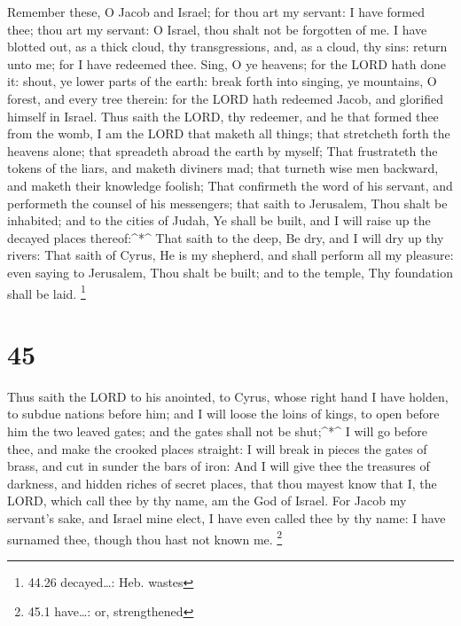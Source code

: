  Remember these, O Jacob and Israel; for thou art my
servant: I have formed thee; thou art my servant: O Israel, thou shalt
not be forgotten of me.  I have blotted out, as a thick
cloud, thy transgressions, and, as a cloud, thy sins: return unto me;
for I have redeemed thee.  Sing, O ye heavens; for the LORD
hath done it: shout, ye lower parts of the earth: break forth into
singing, ye mountains, O forest, and every tree therein: for the LORD
hath redeemed Jacob, and glorified himself in Israel.  Thus
saith the LORD, thy redeemer, and he that formed thee from the womb, I
am the LORD that maketh all things; that stretcheth forth the heavens
alone; that spreadeth abroad the earth by myself;  That
frustrateth the tokens of the liars, and maketh diviners mad; that
turneth wise men backward, and maketh their knowledge foolish;
 That confirmeth the word of his servant, and performeth
the counsel of his messengers; that saith to Jerusalem, Thou shalt be
inhabited; and to the cities of Judah, Ye shall be built, and I will
raise up the decayed places thereof:\^{}*\^{}  That saith
to the deep, Be dry, and I will dry up thy rivers:  That
saith of Cyrus, He is my shepherd, and shall perform all my pleasure:
even saying to Jerusalem, Thou shalt be built; and to the temple, Thy
foundation shall be laid. \footnote{44.26 decayed\ldots: Heb. wastes}

\hypertarget{section-44}{%
\section{45}\label{section-44}}

 Thus saith the LORD to his anointed, to Cyrus, whose right
hand I have holden, to subdue nations before him; and I will loose the
loins of kings, to open before him the two leaved gates; and the gates
shall not be shut;\^{}*\^{}  I will go before thee, and make
the crooked places straight: I will break in pieces the gates of brass,
and cut in sunder the bars of iron:  And I will give thee
the treasures of darkness, and hidden riches of secret places, that thou
mayest know that I, the LORD, which call thee by thy name, am the God of
Israel.  For Jacob my servant's sake, and Israel mine elect,
I have even called thee by thy name: I have surnamed thee, though thou
hast not known me. \footnote{45.1 have\ldots: or, strengthened}

